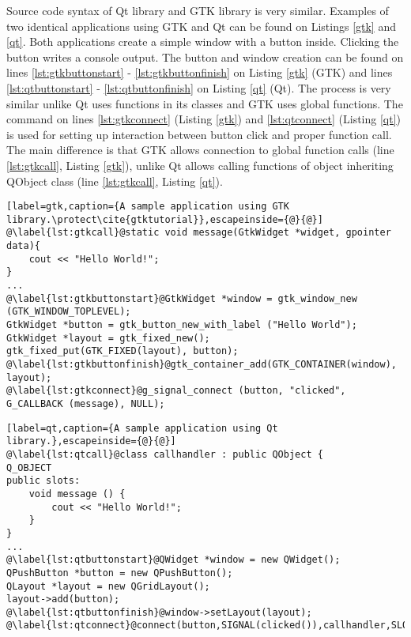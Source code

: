 Source code syntax of Qt library and GTK library is very similar. Examples of two identical applications using GTK and Qt can be found on Listings \ref{gtk} and \ref{qt}. Both applications create a simple window with a button inside. Clicking the button writes a console output. The button and window creation can be found on lines \ref{lst:gtkbuttonstart} - \ref{lst:gtkbuttonfinish} on Listing \ref{gtk} (GTK) and lines \ref{lst:qtbuttonstart} - \ref{lst:qtbuttonfinish} on Listing \ref{qt} (Qt). The process is very similar unlike Qt uses functions in its classes and GTK uses global functions. The command on lines \ref{lst:gtkconnect} (Listing \ref{gtk}) and \ref{lst:qtconnect} (Listing \ref{qt}) is used for setting up interaction between button click and proper function call. The main difference is that GTK allows connection to global function calls (line \ref{lst:gtkcall}, Listing \ref{gtk}), unlike Qt allows calling functions of object inheriting QObject class (line \ref{lst:gtkcall}, Listing \ref{qt}).

\begin{lstlisting}[label=gtk,caption={A sample application using GTK library.\protect\cite{gtktutorial}},escapeinside={@}{@}]
@\label{lst:gtkcall}@static void message(GtkWidget *widget, gpointer data){
    cout << "Hello World!";
}
...
@\label{lst:gtkbuttonstart}@GtkWidget *window = gtk_window_new (GTK_WINDOW_TOPLEVEL);
GtkWidget *button = gtk_button_new_with_label ("Hello World");
GtkWidget *layout = gtk_fixed_new();
gtk_fixed_put(GTK_FIXED(layout), button);
@\label{lst:gtkbuttonfinish}@gtk_container_add(GTK_CONTAINER(window), layout);
@\label{lst:gtkconnect}@g_signal_connect (button, "clicked", G_CALLBACK (message), NULL);
\end{lstlisting}

\begin{lstlisting}[label=qt,caption={A sample application using Qt library.},escapeinside={@}{@}]
@\label{lst:qtcall}@class callhandler : public QObject {
Q_OBJECT
public slots:
	void message () {
		cout << "Hello World!";
	}
}
...
@\label{lst:qtbuttonstart}@QWidget *window = new QWidget();
QPushButton *button = new QPushButton();
QLayout *layout = new QGridLayout();
layout->add(button);
@\label{lst:qtbuttonfinish}@window->setLayout(layout);
@\label{lst:qtconnect}@connect(button,SIGNAL(clicked()),callhandler,SLOT(message()));
\end{lstlisting}